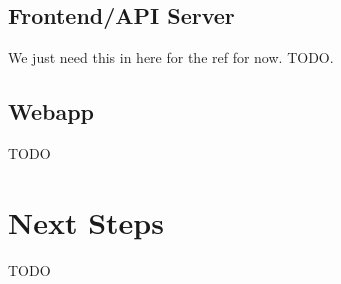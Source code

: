\documentclass[12pt]{article}
\begin{document}
\subsection{Frontend/API Server}\label{api}

We just need this in here for the ref for now. TODO.

\subsection{Webapp}\label{webapp}

TODO

\section{Next Steps}

TODO

\pagebreak

{}
\end{document}
